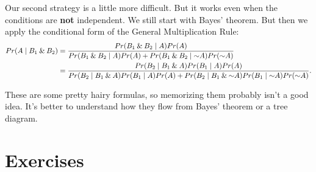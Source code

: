 \documentclass[justified]{tufte-book}
\newcommand{\given}{\mid}
\renewcommand{\neg}{\mathbin{\sim}}
\renewcommand{\wedge}{\mathbin{\&}}
\newcommand{\p}{Pr}
\theoremstyle{definition}
\theoremstyle{definition}
\theoremstyle{definition}
\theoremstyle{remark}
\begin{document}
Our second strategy is a little more difficult. But it works even when the conditions are \textbf{not} independent. We still start with Bayes' theorem. But then we apply the conditional form of the General Multiplication Rule:
\[
  \begin{aligned}
    \p(A \given B_1 \wedge B_2) &= 
      \frac{\p(B_1 \wedge B_2 \given A)\p(A)}{%
            \p(B_1 \wedge B_2 \given A)\p(A) +%
              \p(B_1 \wedge B_2 \given \neg A)\p(\neg A)}\\
      &= \frac{\p(B_2 \given B_1 \wedge A)\p(B_1 \given A)\p(A)}{%
                \p(B_2 \given B_1 \wedge A)\p(B_1 \given A)\p(A) +%
                  \p(B_2 \given B_1 \wedge \neg A)\p(B_1 \given \neg A)\p(\neg A)}.
  \end{aligned}
\]

These are some pretty hairy formulas, so memorizing them probably isn't a good idea. It's better to understand how they flow from Bayes' theorem or a tree diagram.

\hypertarget{exercises-7}{%
\section*{Exercises}\label{exercises-7}}
\end{document}
